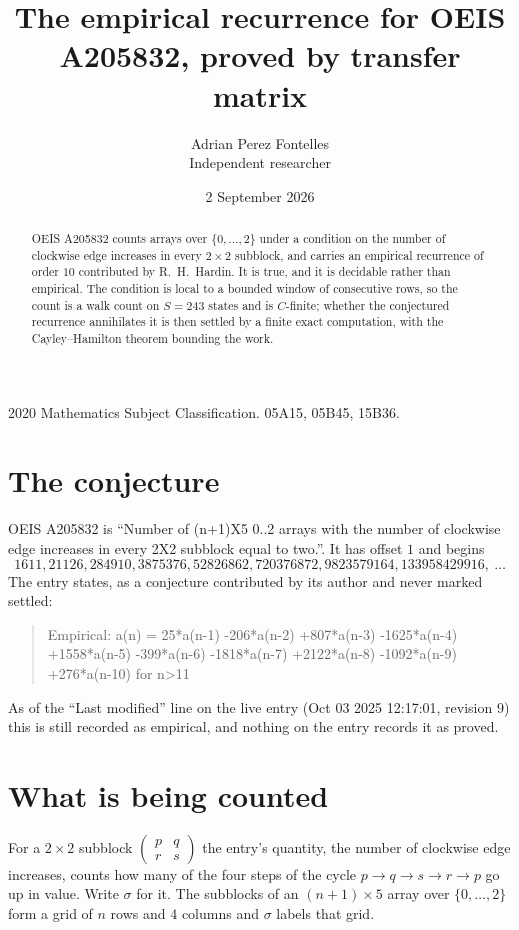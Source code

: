 \documentclass[11pt,a4paper]{article}
\title{The empirical recurrence for OEIS A205832, proved by transfer matrix}
\author{Adrian Perez Fontelles\\ \small Independent researcher}
\date{2 September 2026}
\theoremstyle{plain}
\theoremstyle{definition}
\begin{document}
\maketitle

\begin{abstract}
OEIS A205832 counts arrays over $\{0,\dots,2\}$ under a condition on the number of clockwise edge increases
in every $2\times2$ subblock, and carries an empirical recurrence of order $10$ contributed by
R.~H.~Hardin. It is true, and it is decidable rather than empirical. The condition is local to
a bounded window of consecutive rows, so the count is a walk count on $S=243$ states and is
$C$-finite; whether the conjectured recurrence annihilates it is then settled by a finite exact
computation, with the Cayley--Hamilton theorem bounding the work.
\end{abstract}

\noindent\small 2020 Mathematics Subject Classification. 05A15, 05B45, 15B36.\normalsize

\section{The conjecture}

OEIS A205832 is ``Number of (n+1)X5 0..2 arrays with the number of clockwise edge increases in every 2X2 subblock equal to two.''. It has offset $1$ and begins
\[
1611, 21126, 284910, 3875376, 52826862, 720376872, 9823579164, 133958429916,\ \dots
\]
The entry states, as a conjecture contributed by its author and never marked settled:
\begin{quote}
Empirical: a(n) = 25*a(n-1) -206*a(n-2) +807*a(n-3) -1625*a(n-4) +1558*a(n-5) -399*a(n-6) -1818*a(n-7) +2122*a(n-8) -1092*a(n-9) +276*a(n-10) for n>11
\end{quote}
As of the ``Last modified'' line on the live entry (Oct 03 2025 12:17:01, revision 9) this is still
recorded as empirical, and nothing on the entry records it as proved.

\section{What is being counted}

For a $2\times2$ subblock $\begin{pmatrix}p&q\\r&s\end{pmatrix}$ the
entry's quantity, the number of clockwise edge increases, counts how many of the four steps of the cycle $p\to q\to s\to r\to p$ go up in value. Write $\sigma$ for it. The subblocks of an
$(n+1)\times5$ array over $\{0,\dots,2\}$ form a grid of $n$ rows and $4$
columns and $\sigma$ labels that grid.
\end{document}
